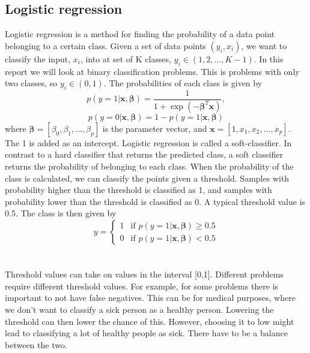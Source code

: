 \subsection{Logistic regression}
Logistic regression is a method for finding the probability of a data point belonging to a certain class.  Given a set of data points $(y_i, x_i)$, we want to classify the input, $x_i$, into at set of K classes, $y_i \in (1,2,...,K-1)$. In this report we will look at binary classification problems. This is problems with only two classes, so $y_i \in (0,1)$. The probabilities of each class is given by
\begin{equation}
    p(y = 1 | \boldsymbol{x}, \boldsymbol{\beta}) = \frac{1}{1 + \exp(-\boldsymbol{\beta}^T\boldsymbol{x})},
\end{equation}
\begin{equation}
    p(y = 0|\boldsymbol{x}, \boldsymbol{\beta}) = 1 -   p(y = 1 | \boldsymbol{x}, \boldsymbol{\beta})
\end{equation}
where $\boldsymbol{\beta} = [\beta_0, \beta_1, ..., \beta_p]$ is the parameter vector, and $\boldsymbol{x} = [1, x_1, x_2, ..., x_p]$.\cite{Hands-On} The 1 is added as an intercept. Logistic regression is called a soft-classifier. In contrast to a hard classifier that returns the predicted class, a soft classifier returns the probability of belonging to each class. When the probability of the class is calculated, we can classify the points given a threshold. Samples with probability higher than the threshold is classified as 1, and  samples with probability lower than the threshold is classified as 0. A typical threshold value is 0.5. The class is then given by 
\begin{equation}
   y =  \begin{cases}
    1 & \text{if } p(y = 1 | \boldsymbol{x}, \boldsymbol{\beta}) \geq 0.5 \\
    0 & \text{if } p(y = 1 | \boldsymbol{x}, \boldsymbol{\beta}) < 0.5
    \end{cases}
\end{equation}
\\
\\
Threshold values can take on values in the interval [0,1]. Different problems require different threshold values. For example, for some problems there is important to not have false negatives.  This can be for medical purposes, where we don't want to classify a sick person as a healthy person. Lowering the threshold can then lower the chance of this. However, choosing it to low might lead to classifying a lot of healthy people as sick. There have to be a balance between the two.  
